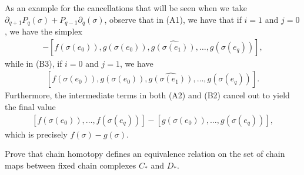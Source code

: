 \documentclass[10pt]{mypackage}
\begin{document}
\begin{solution}
  As an example for the cancellations that will be seen when we take $\partial_{q+1}P_q(\sigma) + P_{q-1}\partial_q(\sigma)$, observe that in (A1), we have that if $i = 1$ and $j = 0$, we have the simplex
  \begin{align*}
    -\left[ f\left( \sigma\left( e_0 \right) \right),g\left( \sigma\left( e_0 \right) \right),\widehat{g\left( \sigma\left( e_1 \right) \right)},\dots,g\left( \sigma\left( e_q \right) \right) \right],
  \end{align*}
  while in (B3), if $i = 0$ and $j = 1$, we have
  \begin{align*}
    \left[ f\left( \sigma\left( e_0 \right) \right),g\left( \sigma\left( e_0 \right) \right),\widehat{g\left( \sigma\left( e_1 \right) \right)},\dots,g\left( \sigma\left( e_q \right) \right) \right].
  \end{align*}
  Furthermore, the intermediate terms in both (A2) and (B2) cancel out to yield the final value 
  \begin{align*}
    \left[ f\left( \sigma\left( e_0 \right) \right),\dots,f\left( \sigma\left( e_q \right) \right) \right] - \left[ g\left( \sigma\left( e_0 \right) \right),\dots,g\left( \sigma\left( e_q \right) \right) \right],
  \end{align*}
  which is precisely $f(\sigma)-g(\sigma)$.
\end{solution}
\begin{problem}[Problem 2]
  Prove that chain homotopy defines an equivalence relation on the set of chain maps between fixed chain complexes $C_{\ast}$ and $D_{\ast}$.
\end{problem}
\end{document}
